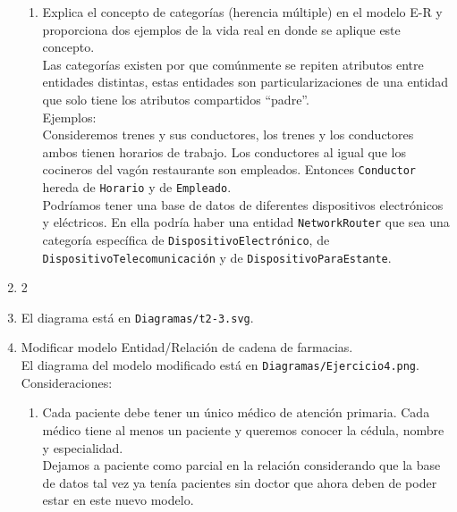 \documentclass[12pt,a4paper]{article}
\begin{document}
\begin{enumerate}
\begin{enumerate}
			\item Explica el concepto de categorías (herencia múltiple) en el modelo E-R
				y proporciona dos ejemplos de la vida real en donde se aplique este concepto.\\

				Las categorías existen por que comúnmente se repiten atributos entre
				entidades distintas, estas entidades son particularizaciones de una entidad
				que solo tiene los atributos compartidos ``padre''.\\

				Ejemplos:\\
				Consideremos trenes y sus conductores, los trenes y los
				conductores ambos tienen horarios de trabajo. Los conductores
				al igual que los cocineros del vagón restaurante son empleados.
				Entonces \texttt{Conductor} hereda de \texttt{Horario} y de \texttt{Empleado}.\\

				Podríamos tener una base de datos de diferentes dispositivos electrónicos y eléctricos.
				En ella podría haber una entidad \texttt{NetworkRouter} que sea una categoría
				específica de \texttt{DispositivoElectrónico}, de \texttt{DispositivoTelecomunicación}
				y de \texttt{DispositivoParaEstante}.\\

		\end{enumerate}

	\item 2
	\item 
	
El diagrama  está en \texttt{Diagramas/t2-3.svg}.
	
	\item Modificar modelo Entidad/Relación de cadena de farmacias.\\
		El diagrama del modelo modificado está en \texttt{Diagramas/Ejercicio4.png}.\\

		Consideraciones:\\
		\begin{enumerate}
			\item Cada paciente debe tener un único médico de atención primaria. Cada médico tiene al menos un paciente
				y queremos conocer la cédula, nombre y especialidad.\\

				Dejamos a paciente como parcial en la relación considerando que
				la base de datos tal vez ya tenía pacientes sin doctor que ahora
				deben de poder estar en este nuevo modelo.\\


\end{enumerate}
\end{enumerate}
\end{document}
